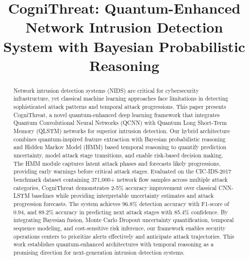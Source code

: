 \documentclass[conference]{IEEEtran}
\begin{document}
\title{CogniThreat: Quantum-Enhanced Network Intrusion Detection System with Bayesian Probabilistic Reasoning}

\author{
\and
{}
\and
{}
\and
{}
}

\maketitle

\begin{abstract}
Network intrusion detection systems (NIDS) are critical for cybersecurity infrastructure, yet classical machine learning approaches face limitations in detecting sophisticated attack patterns and temporal attack progressions. This paper presents CogniThreat, a novel quantum-enhanced deep learning framework that integrates Quantum Convolutional Neural Networks (QCNN) with Quantum Long Short-Term Memory (QLSTM) networks for superior intrusion detection. Our hybrid architecture combines quantum-inspired feature extraction with Bayesian probabilistic reasoning and Hidden Markov Model (HMM) based temporal reasoning to quantify prediction uncertainty, model attack stage transitions, and enable risk-based decision making. The HMM module captures latent attack phases and forecasts likely progressions, providing early warnings before critical attack stages. Evaluated on the CIC-IDS-2017 benchmark dataset containing 371,000+ network flow samples across multiple attack categories, CogniThreat demonstrates 2-5\% accuracy improvement over classical CNN-LSTM baselines while providing interpretable uncertainty estimates and attack progression forecasts. The system achieves 96.8\% detection accuracy with F1-score of 0.94, and 89.2\% accuracy in predicting next attack stages with 85.4\% confidence. By integrating Bayesian fusion, Monte Carlo Dropout uncertainty quantification, temporal sequence modeling, and cost-sensitive risk inference, our framework enables security operations centers to prioritize alerts effectively and anticipate attack trajectories. This work establishes quantum-enhanced architectures with temporal reasoning as a promising direction for next-generation intrusion detection systems.
\end{abstract}
\end{document}
